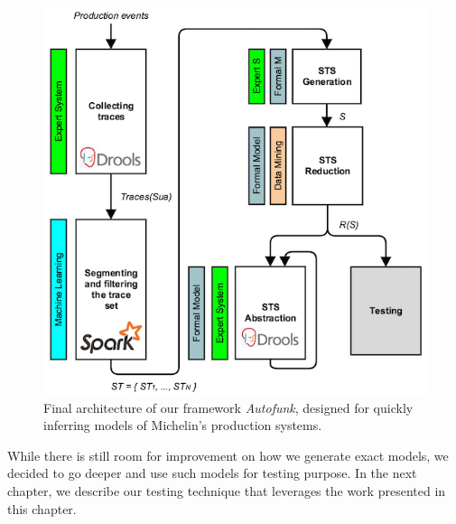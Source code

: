 \begin{figure}[h]
    \begin{center}
        \includegraphics[width=1.0\linewidth]{figures/autofunk_branded.png}
    \end{center}

    \caption{Final architecture of our framework \textit{Autofunk},
    designed for quickly inferring models of Michelin's production systems.}
    \label{fig:autofunk_branded}
\end{figure}

While there is still room for improvement on how we generate
exact models, we decided to go deeper and use such models for
testing purpose. In the next chapter, we describe our testing
technique that leverages the work presented in this chapter.
